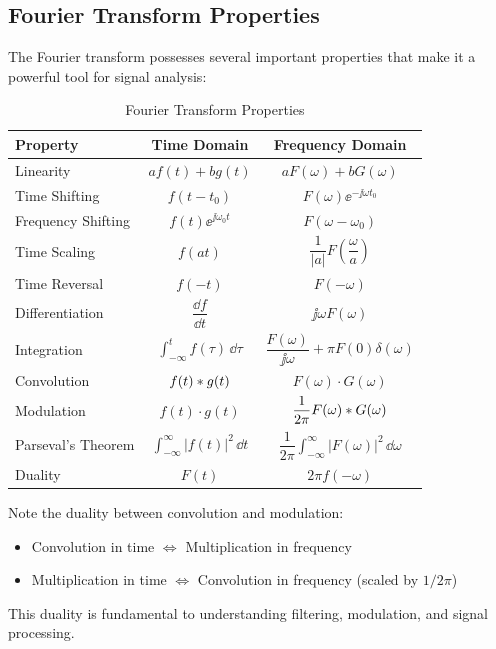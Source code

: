 \subsection{Fourier Transform Properties}

The Fourier transform possesses several important properties that make it a powerful tool for signal analysis:

\begin{table}[htbp]
\centering
\caption{Fourier Transform Properties}
\label{tab:fourier_properties}
\begin{tabular}{@{}lcc@{}}
\toprule
\textbf{Property} & \textbf{Time Domain} & \textbf{Frequency Domain} \\
\midrule
Linearity & $af(t) + bg(t)$ & $aF(\omega) + bG(\omega)$ \\[6pt]
Time Shifting & $f(t - t_0)$ & $F(\omega)\ee^{-\jj\omega t_0}$ \\[6pt]
Frequency Shifting & $f(t)\ee^{\jj\omega_0 t}$ & $F(\omega - \omega_0)$ \\[6pt]
Time Scaling & $f(at)$ & $\dfrac{1}{|a|}F\left(\dfrac{\omega}{a}\right)$ \\[6pt]
Time Reversal & $f(-t)$ & $F(-\omega)$ \\[6pt]
Differentiation & $\dfrac{\dd f}{\dd t}$ & $\jj\omega F(\omega)$ \\[6pt]
Integration & $\displaystyle\int_{-\infty}^{t} f(\tau)\,\dd\tau$ & $\dfrac{F(\omega)}{\jj\omega} + \pi F(0)\delta(\omega)$ \\[6pt]
Convolution & $f(t) \ast g(t)$ & $F(\omega) \cdot G(\omega)$ \\[6pt]
Modulation & $f(t) \cdot g(t)$ & $\dfrac{1}{2\pi}F(\omega) \ast G(\omega)$ \\[6pt]
Parseval's Theorem & $\displaystyle\int_{-\infty}^{\infty}|f(t)|^2\,\dd t$ & $\dfrac{1}{2\pi}\displaystyle\int_{-\infty}^{\infty}|F(\omega)|^2\,\dd\omega$ \\[6pt]
Duality & $F(t)$ & $2\pi f(-\omega)$ \\
\bottomrule
\end{tabular}
\end{table}

\begin{warningbox}[title=Convolution vs. Modulation]
Note the duality between convolution and modulation:
\begin{itemize}
    \item Convolution in time $\Leftrightarrow$ Multiplication in frequency
    \item Multiplication in time $\Leftrightarrow$ Convolution in frequency (scaled by $1/2\pi$)
\end{itemize}
This duality is fundamental to understanding filtering, modulation, and signal processing.
\end{warningbox}

